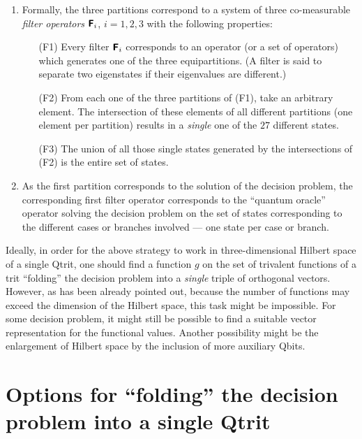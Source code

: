 \documentclass[pra,amsfonts,showpacs,showkeys,preprint]{revtex4}
\begin{document}
\begin{enumerate}
\item
Formally, the three partitions correspond to a system of three co-measurable
{\em filter operators} $\textsf{\textbf{F}}_i$, $i=1,2,3$
with the following properties:
\begin{enumerate}
\item[(F1)]
Every filter $\textsf{\textbf{F}}_i$
corresponds to an operator (or a set of operators)
which generates one of the three
equipartitions.
(A filter is said to separate two eigenstates if their eigenvalues are different.)
\item[(F2)]
From each one of the three partitions of (F1), take an arbitrary element.
The intersection of these elements of all different partitions (one element per partition)
results in a {\it single} one of the $27$ different states.
\item[(F3)]
The union of all those single states generated by the intersections of (F2)
is the entire set of states.
\end{enumerate}

\item
As the first partition corresponds to the solution of the decision problem,
the corresponding first filter operator corresponds to the ``quantum oracle'' operator solving the decision problem
on the set of states corresponding to the different cases or branches involved --- one state per case or branch.

\end{enumerate}


Ideally, in order for the above strategy to work in three-dimensional Hilbert space of a single Qtrit,
one should find a function $g$ on the set of trivalent functions of a trit ``folding'' the decision problem  into a  {\em single} triple of orthogonal vectors.
However, as has been already pointed out, because the number of functions may exceed the dimension of the Hilbert space, this task might be impossible.
For some decision problem, it might still be possible to find a suitable vector representation for the functional values.
Another possibility might be the enlargement of Hilbert space by the inclusion of more auxiliary Qbits.

\section{Options for ``folding'' the decision problem into a single Qtrit}
\end{document}
